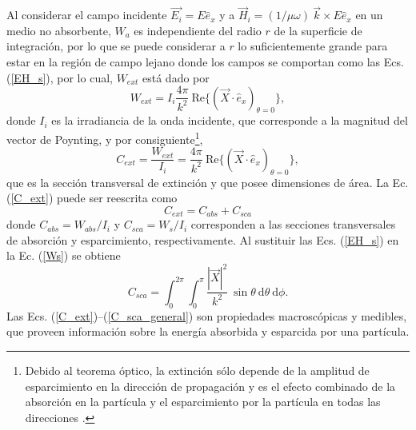 Al considerar el campo incidente $\Vec{E_i}=E\hat{e}_x$ y a $\Vec{H}_i=(1/\mu \omega)\: \Vec{k} \times E \hat{e}_x$ en un medio no absorbente, $W_a$ es independiente del radio $r$ de la superficie de integración, por lo que se puede considerar a $r$ lo suficientemente grande para estar en la región de campo lejano donde los campos se comportan como las Ecs. (\ref{EH_s}), por lo cual, $W_{ext}$ está dado por \cite{Bohren}
\begin{equation*}
	W_{ext}=I_i\frac{4\pi}{k^2}\:\text{Re}\{(\Vec{X}\cdot\hat{e}_x)_{\theta=0}\},
\end{equation*}
donde $I_i$ es la irradiancia de la onda incidente, que corresponde a la magnitud del vector de Poynting, y por consiguiente\footnote{Debido al teorema óptico, la extinción sólo depende de la amplitud de esparcimiento en la dirección de propagación y es el efecto combinado de la absorción en la partícula y el esparcimiento por la partícula en todas las direcciones \cite{Bohren}.},
\begin{equation}
	C_{ext}=\frac{W_{ext}}{I_i}=\frac{4\pi}{k^2}\:\text{Re}\{(\Vec{X}\cdot\hat{e}_x)_{\theta=0}\}, \label{C_ext}
\end{equation}
que es la sección transversal de extinción y que posee dimensiones de área. La Ec. (\ref{C_ext}) puede ser reescrita como \cite{Bohren}
\begin{equation}
	C_{ext}=C_{abs}+C_{sca}
	\label{C}
\end{equation}
donde $C_{abs}=W_{abs}/I_i$ y $C_{sca}=W_s/I_i$ corresponden a las secciones transversales de absorción y esparcimiento, respectivamente. Al sustituir las Ecs. (\ref{EH_s}) en la Ec. (\ref{Ws}) se obtiene
\begin{equation}
	C_{sca}=\int_0^{2\pi}\int_0^{\pi}\frac{|\Vec{X}|^2}{k^2}\:\sin\theta\: \text{d}\theta\:\text{d}\phi.
	\label{C_sca_general}
\end{equation}
Las Ecs. (\ref{C_ext})--(\ref{C_sca_general}) son propiedades macroscópicas y medibles, que proveen información sobre la energía absorbida y esparcida por una partícula.  \\

